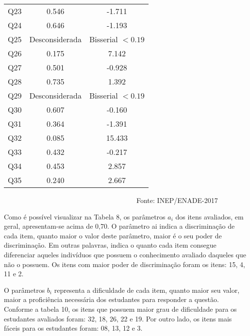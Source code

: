 \documentclass[12pt]{article}
\begin{document}
\begin{table}[htp]
\begin{tabular}{c|c|c}
  Q23         &   0.546            &  -1.711                  \\
  Q24         &   0.646            &   -1.193                 \\
  Q25         &   Desconsiderada   &   Bisserial $< 0.19$                 \\
  Q26         &   0.175            &    7.142                \\
  Q27         &   0.501            &   -0.928                 \\
  Q28         &   0.735            &   1.392                 \\
  Q29         &   Desconsiderada   &   Bisserial $< 0.19$                  \\
  Q30         &   0.607            &   -0.160                 \\
  Q31         &   0.364            &   -1.391                 \\
  Q32         &   0.085            &   15.433                 \\
  Q33         &   0.432            &   -0.217                 \\
  Q34         &   0.453            &   2.857                 \\
  Q35         &   0.240            &  2.667                \\
\hline\hline
\end{tabular}
\begin{flushleft}
\ \ \ \ \ \ \ \ \ \ \ \ \ \ \ \ \ \ \ \ \ \ \ \ \ \ \ \ \ \ \ \ \ \ \ \ \ \ \ Fonte: INEP/ENADE-2017
\end{flushleft}
\end{table}

Como é possível visualizar na Tabela 8, os parâmetros $a_{i}$  dos itens avaliados, em geral, apresentam-se acima de 0,70. O parâmetro ai indica a discriminação de cada item, quanto maior o valor deste parâmetro, maior é o seu poder de discriminação. Em outras palavras, indica o quanto cada item consegue diferenciar aqueles indivíduos que possuem o conhecimento avaliado daqueles que não o possuem. Os itens com maior poder de discriminação foram os itens: 15, 4, 11 e 2. 

O parâmetros $b_{i}$ representa a dificuldade de cada item, quanto maior seu valor, maior a proficiência necessária dos estudantes para responder a questão. Conforme a tabela 10, os itens que possuem maior grau de dificuldade para os estudantes avaliados foram: 32, 18, 26, 22 e 19. Por outro lado, os itens mais fáceis para os estudantes foram: 08, 13, 12 e 3.
\end{document}
